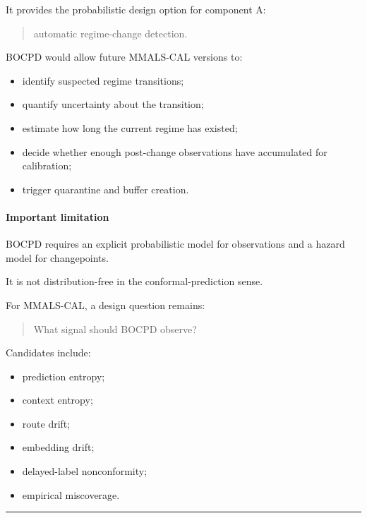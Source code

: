 It provides the probabilistic design option for component A:

\begin{quote}
automatic regime-change detection.
\end{quote}

BOCPD would allow future MMALS-CAL versions to:

\begin{itemize}
\tightlist
\item
  identify suspected regime transitions;
\item
  quantify uncertainty about the transition;
\item
  estimate how long the current regime has existed;
\item
  decide whether enough post-change observations have accumulated for calibration;
\item
  trigger quarantine and buffer creation.
\end{itemize}

\paragraph{Important limitation}\label{important-limitation-2}

BOCPD requires an explicit probabilistic model for observations and a hazard model for changepoints.

It is not distribution-free in the conformal-prediction sense.

For MMALS-CAL, a design question remains:

\begin{quote}
What signal should BOCPD observe?
\end{quote}

Candidates include:

\begin{itemize}
\tightlist
\item
  prediction entropy;
\item
  context entropy;
\item
  route drift;
\item
  embedding drift;
\item
  delayed-label nonconformity;
\item
  empirical miscoverage.
\end{itemize}

\begin{center}\rule{0.5\linewidth}{0.5pt}\end{center}

